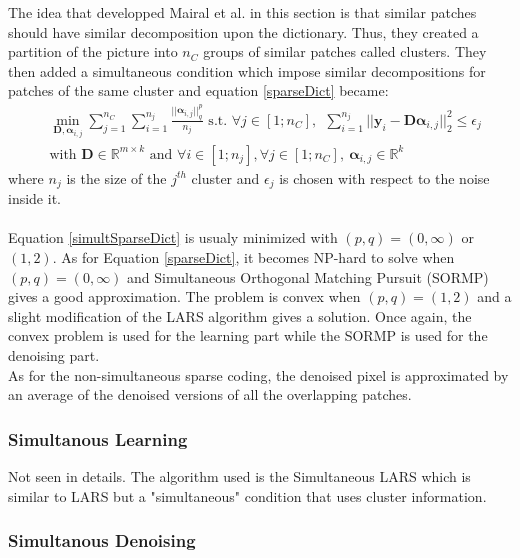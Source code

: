 \documentclass{ipol}
\newcommand{\psize}{m}
\newcommand{\dsize}{k}
\newcommand{\dict}{\textbf{D}}
\newcommand{\code}{\bm{\alpha}}
\newcommand{\pnorm}{p}
\newcommand{\qnorm}{q}
\newcommand{\nclust}{n_C}
\newcommand{\noi}{\textbf{y}}
\newcommand{\RR}{\mathbb{R}}
\begin{document}
The idea that developped Mairal et al. in this section is that similar patches should have similar decomposition upon the dictionary. Thus, they created a partition of the picture into $\nclust$ groups of similar patches called clusters. They then added a simultaneous condition which impose similar decompositions for patches of the same cluster and equation \eqref{sparseDict} became:
\begin{equation}
\begin{split}
	&\min_{\dict, \code_{i,j}} \sum_{j=1}^{\nclust} \sum_{i=1}^{n_j} \frac{||\code_{i,j}||^\pnorm_\qnorm}{n_j} \text{ s.t. } \forall j \in [1; \nclust],\ \ \sum_{i=1}^{n_j}||\noi_i  - \dict \code_{i,j}||^2_2 \leqslant \epsilon_j \\
	& \text{with } \dict \in \RR^{\psize \times \dsize} \text{ and } \forall i \in [1;n_j], \forall j \in [1; \nclust], \ \code_{i,j} \in \RR^\dsize
	\label{simultSparseDict}
\end{split}
\end{equation}
where $n_j$ is the size of the $j^{th}$ cluster and $\epsilon_j$ is chosen with respect to the noise inside it.\\
\\
Equation \eqref{simultSparseDict} is usualy minimized with $(\pnorm, \qnorm) = (0, \infty)$ or $(1, 2)$. As for Equation \eqref{sparseDict}, it becomes NP-hard to solve when $(\pnorm, \qnorm)=(0, \infty)$ and Simultaneous Orthogonal Matching Pursuit (SORMP) \cite{SOMP} gives a good approximation. The problem is convex when $(\pnorm, \qnorm)=(1, 2)$ and a slight modification of the LARS algorithm gives a solution. Once again, the convex problem is used for the learning part while the SORMP is used for the denoising part.\\
As for the non-simultaneous sparse coding, the denoised pixel is approximated by an average of the denoised versions of all the overlapping patches.

\subsubsection{Simultanous Learning}

Not seen in details. The algorithm used is the Simultaneous LARS which is similar to LARS but a "simultaneous" condition that uses cluster information.

\subsubsection{Simultanous Denoising}
\end{document}
